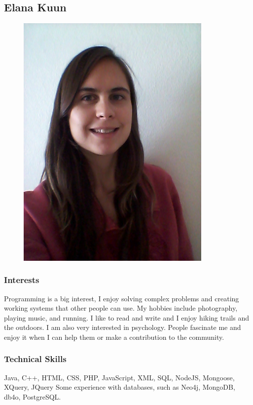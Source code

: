 \documentclass[hidelinks, 12pt, oneside]{article}
\begin{document}
\subsection{Elana Kuun}
\begin{figure}[ht!]
  \centering
    \includegraphics[width=0.85\textwidth]{lana} 
\end{figure}

\subsubsection{Interests}
Programming is a big interest, I enjoy solving complex problems and creating working systems that other people can use. My hobbies include photography, playing music, and running. I like to read and write and I enjoy hiking trails and the outdoors. I am also very interested in psychology. People fascinate me and enjoy it when I can help them or make a contribution to the community.
\subsubsection{Technical Skills}
Java, C++, HTML, CSS, PHP, JavaScript, XML, SQL, NodeJS, Mongoose, XQuery, JQuery
Some experience with databases, such as Neo4j, MongoDB, db4o, PostgreSQL.
\end{document}
